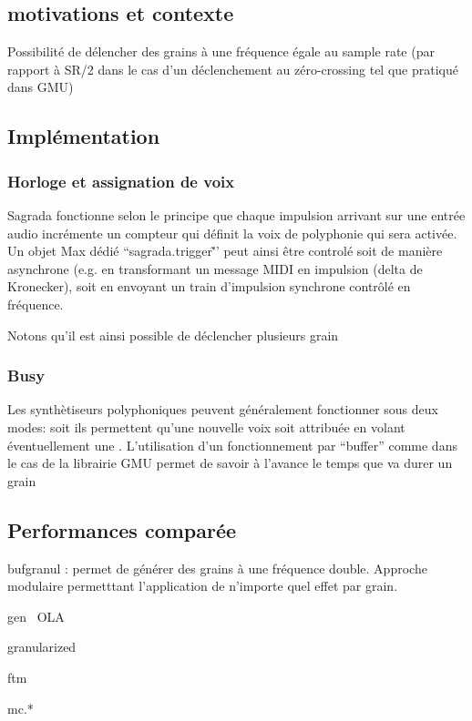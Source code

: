 \subsection{motivations et contexte}
Possibilité de délencher des grains à une fréquence égale au sample rate (par rapport à SR/2 dans le cas d'un déclenchement au zéro-crossing tel que pratiqué dans GMU)
\subsection{Implémentation}
\subsubsection{Horloge et assignation de voix}
Sagrada fonctionne selon le principe que chaque impulsion arrivant sur une entrée audio incrémente un compteur qui définit la voix de polyphonie qui sera activée. Un objet Max dédié ``sagrada.trigger\~'' peut ainsi être controlé soit de manière asynchrone (e.g. en transformant un message MIDI en impulsion (delta de Kronecker), soit en envoyant un train d'impulsion synchrone contrôlé en fréquence.

Notons qu'il est ainsi possible de déclencher plusieurs grain

\subsubsection{Busy}
Les synthètiseurs polyphoniques peuvent généralement fonctionner sous deux modes: soit ils permettent qu'une nouvelle voix soit attribuée en volant éventuellement une .
L'utilisation d'un fonctionnement par ``buffer'' comme dans le cas de la librairie GMU permet de savoir à l'avance le temps que va durer un grain

\subsection{Performances comparée}
bufgranul : permet de générer des grains à une fréquence double. Approche modulaire permetttant l'application de n'importe quel effet par grain.

gen~ OLA

granularized

ftm

mc.*
